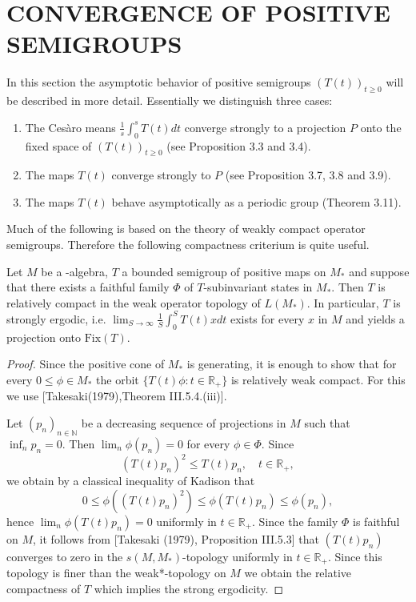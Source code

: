 \section{CONVERGENCE OF POSITIVE SEMIGROUPS}\label{sec:d4-3}

In this section the asymptotic behavior of positive semigroups $(T(t))_{t \geq 0}$ will be described in more detail.
Essentially we distinguish three cases:

\begin{enumerate}[(1)]
\item
The Cesàro means $\frac{1}{s}\int_{0}^{s} T(t)dt$ converge strongly to a projection $P$ onto the fixed space of $(T(t))_{t \geq 0}$ (see Proposition 3.3 and 3.4).

\item
The maps $T(t)$ converge strongly to $P$ (see Proposition 3.7, 3.8 and 3.9).

\item
The maps $T(t)$ behave asymptotically as a periodic group (Theorem 3.11).
\end{enumerate}

Much of the following is based on the theory of weakly compact operator semigroups.
Therefore the following compactness criterium is quite useful.

\begin{proposition}\label{prop:d4-3.1}
Let $M$ be a \WA-algebra, $T$ a bounded semigroup of positive maps on $M_{*}$ and suppose that there exists a faithful family $\Phi$ of $T$-subinvariant states in $M_{*}$.
Then $T$ is relatively compact in the weak operator topology of $L(M_{*})$.
In particular, $T$ is strongly ergodic, i.e. $\lim_{S \to \infty} \frac{1}{S}\int_{0}^{S} T(t)xdt$ exists for every $x$ in $M$ and yields a projection onto $\text{Fix}(T)$.
\end{proposition}

\begin{proof}
Since the positive cone of $M_{*}$ is generating, it is enough to show that for every $0 \leq \phi \in M_{*}$ the orbit $\{T(t)\phi : t \in \mathbb{R}_{+}\}$ is relatively weak compact.
For this we use [Takesaki(1979),Theorem III.5.4.(iii)].


\newpage

Let $(p_{n})_{n \in \mathbb{N}}$ be a decreasing sequence of projections in $M$ such that $\inf_{n} p_{n} = 0$.
Then $\lim_{n}\phi(p_{n}) = 0$ for every $\phi \in \Phi$.
Since
\[
(T(t)p_{n})^2 \leq T(t)p_{n}, \quad t \in \mathbb{R}_{+},
\]
we obtain by a classical inequality of Kadison that
\[
0 \leq \phi((T(t)p_{n})^2) \leq \phi(T(t)p_{n}) \leq \phi(p_{n}),
\]
hence $\lim_{n}\phi(T(t)p_{n}) = 0$ uniformly in $t \in \mathbb{R}_{+}$.
Since the family $\Phi$ is faithful on $M$, it follows from [Takesaki (1979), Proposition III.5.3] that $(T(t)p_{n})$ converges to zero in the $s(M,M_{*})$-topology uniformly in $t \in \mathbb{R}_{+}$.
Since this topology is finer than the weak*-topology on $M$ we obtain the relative compactness of $T$ which implies the strong ergodicity.
\end{proof}

